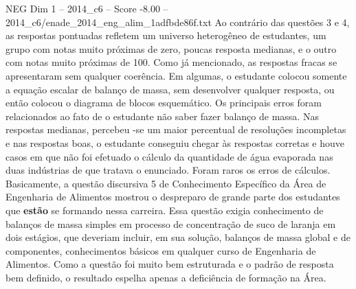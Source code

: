\begin{textsample}{NEG Dim 1 – 2014\_c6 – Score -8.00 – 2014\_c6/enade\_2014\_eng\_alim\_1adfbde86f.txt}
Ao contrário das questões 3 e 4, as respostas pontuadas refletem um universo heterogêneo de estudantes, um grupo com notas muito próximas de zero, poucas resposta medianas, e o outro com notas muito próximas de 100.
Como já mencionado, as respostas fracas se apresentaram sem qualquer coerência.
Em algumas, o estudante colocou somente a equação escalar de balanço de massa, sem desenvolver qualquer resposta, ou então colocou o diagrama de blocos esquemático.
Os principais erros foram relacionados ao fato de o estudante não saber fazer balanço de massa.
Nas respostas medianas, percebeu -se um maior percentual de resoluções incompletas e nas respostas boas, o estudante conseguiu chegar às respostas corretas e houve casos em que não foi efetuado o cálculo da quantidade de água evaporada nas duas indústrias de que tratava o enunciado.
Foram raros os erros de cálculos.
Basicamente, a questão discursiva 5 de Conhecimento Específico da Área de Engenharia de Alimentos mostrou o despreparo de grande parte dos estudantes que \textbf{estão} se formando nessa carreira.
Essa questão exigia conhecimento de balanços de massa simples em processo de concentração de suco de laranja em dois estágios, que deveriam incluir, em sua solução, balanços de massa global e de componentes, conhecimentos básicos em qualquer curso de Engenharia de Alimentos.
Como a questão foi muito bem estruturada e o padrão de resposta bem definido, o resultado espelha apenas a deficiência de formação na Área.

\end{textsample}
